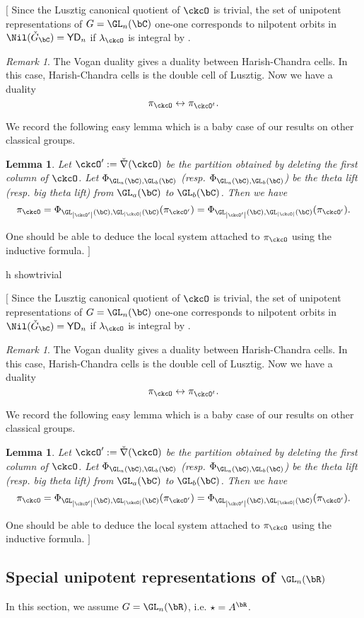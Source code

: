 \documentclass[12pt,a4paper]{amsart}
\newcommand{\trivial}[2][]{\if\relax\detokenize{#1}\relax
  {%
      \color{orange} \vspace{0em} $[$  #2 $]$
      \color{black}
  }
  \else
\ifx#1h
\ifcsname showtrivial\endcsname
{%
    \color{orange} \vspace{0em}  $[$ #2 $]$
    \color{black}
}
\fi
\else {\red Wrong argument!} \fi
\fi
}
\def\abs#1{\left|{#1}\right|}
\newcommand{\sgn}{\operatorname{sgn}}
\def\DDD{{\check\nabla}}
\numberwithin{equation}{section}
\newtheorem{lem}[thm]{Lemma}
\theoremstyle{remark}
\newtheorem{remark}[thm]{Remark}
\def\ckGc{\check{G}_{\bC}}
\def\YD{\mathsf{YD}}
\def\lamck{\lambda_\ckcO}
\def\LC{{}^{\scriptscriptstyle L}\sC}
\def\LRC{{}^{\scriptscriptstyle LR}\sC}
\def\AND{\quad \text{and} \quad}
\def\Spr{\mathrm{Springer}}
\begin{document}
\trivial[]{
Since the Lusztig canonical quotient of $\ckcO$ is trivial, the set of unipotent representations
of $G = \GL_n(\bC)$ one-one corresponds to nilpotent orbits in
$\Nil(\ckGc) = \YD_{n}$ if $\lamck$ is integral by
\cite{BVUni}.


\begin{remark}
The Vogan duality gives a duality between Harish-Chandra cells.
In this case, Harish-Chandra cells is the double cell
of Lusztig.
Now we have a duality
\[
 \pi_\ckcO \leftrightarrow \pi_{\ckcO^t}.
\]
\end{remark}

We record the following easy lemma which is a baby case of our results on other
classical groups.
\begin{lem}
  Let $\ckcO' := \DDD(\ckcO)$ be the partition obtained by deleting the first
  column of $\ckcO$. Let $\Phi_{\GL_{a}(\bC),\GL_{b}(\bC)}$ (resp.
  $\Phi_{\GL_{a}(\bC),\GL_{b}(\bC)}$) be the theta lift (resp. big theta lift)
  from $\GL_a(\bC)$ to $\GL_b(\bC)$. Then we have
  \[
    \pi_{\ckcO} = \Phi_{\GL_{\abs{\ckcO'}}(\bC),\GL_{\abs{\ckcO}}(\bC)} (\pi_{\ckcO'})= \Phi_{\GL_{\abs{\ckcO'}}(\bC),\GL_{\abs{\ckcO}}(\bC)} (\pi_{\ckcO'}).
  \]
\end{lem}

One should be able to deduce the local system attached to $\pi_{\ckcO}$ using
the inductive formula.
}

\subsection{Special unipotent representations of $\GL_n(\bR)$}
In this section, we assume $G = \GL_{n}(\bR)$,  i.e.
$\star=A^{\bR}$.



\end{document}
